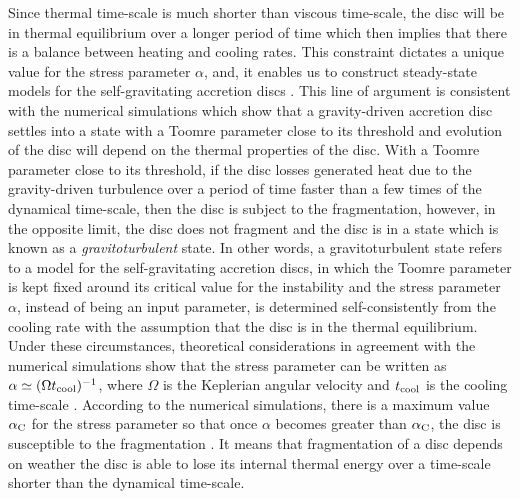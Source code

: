 \documentclass[apj]{emulateapj}
\begin{document}
Since thermal time-scale is much shorter than viscous time-scale, the  disc will be in thermal equilibrium over a longer period of time which then implies that there is a balance between heating and cooling rates. This constraint dictates a unique value for the stress parameter $\alpha$, and,  it enables us to construct steady-state  models for the self-gravitating accretion discs  \citep[][]{rafikov2009,Rafikov15}. This line of argument is consistent with the numerical simulations which show that a gravity-driven accretion disc settles into a state with a Toomre parameter close to its threshold and evolution of the disc will depend on the thermal properties of the disc.   With a Toomre parameter close to its threshold, if the disc losses generated heat due to the gravity-driven turbulence over a period of time faster than a few times of the dynamical time-scale, then the disc is subject to the fragmentation, however, in the opposite limit, the disc does not fragment and the disc is in a state which is known as a {\it gravitoturbulent} state. In other words, a gravitoturbulent state refers to a model for the self-gravitating accretion discs, in which the Toomre parameter is kept fixed around its critical value for the instability and the stress parameter $\alpha$, instead of being an input parameter, is determined self-consistently from the cooling rate with the assumption that the disc is in the thermal equilibrium. Under these circumstances, theoretical considerations in agreement with the numerical simulations show that the stress parameter can be written as $\alpha \simeq (\Omega t_{\rm cool})^{-1}$, where $\Omega$ is the Keplerian angular velocity and $t_{\rm cool}$ is the cooling time-scale  \citep[e.g.,][]{gami,Rafikov2005,rafikov2009}. According to the numerical simulations, there is a maximum value $\alpha_{\rm C}$ for the stress parameter so that once $\alpha$ becomes greater than $\alpha_{\rm C}$, the disc is susceptible  to the fragmentation  \citep[e.g.,][]{Rice2003,Rice2005}. It means that fragmentation of a disc depends on weather the disc is able to lose its internal thermal energy over a time-scale shorter than the dynamical time-scale.
\end{document}
